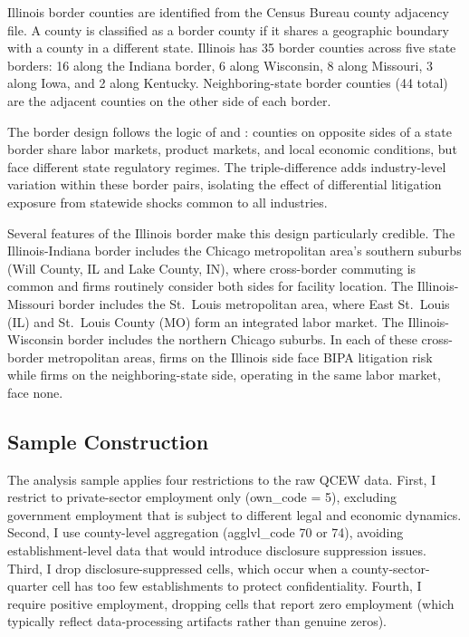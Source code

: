 \documentclass[12pt]{article}
\begin{document}
Illinois border counties are identified from the Census Bureau county adjacency file. A county is classified as a border county if it shares a geographic boundary with a county in a different state. Illinois has 35 border counties across five state borders: 16 along the Indiana border, 6 along Wisconsin, 8 along Missouri, 3 along Iowa, and 2 along Kentucky. Neighboring-state border counties (44 total) are the adjacent counties on the other side of each border.

The border design follows the logic of \citet{dube2010} and \citet{holmes1998}: counties on opposite sides of a state border share labor markets, product markets, and local economic conditions, but face different state regulatory regimes. The triple-difference adds industry-level variation within these border pairs, isolating the effect of differential litigation exposure from statewide shocks common to all industries.

Several features of the Illinois border make this design particularly credible. The Illinois-Indiana border includes the Chicago metropolitan area's southern suburbs (Will County, IL and Lake County, IN), where cross-border commuting is common and firms routinely consider both sides for facility location. The Illinois-Missouri border includes the St.\ Louis metropolitan area, where East St.\ Louis (IL) and St.\ Louis County (MO) form an integrated labor market. The Illinois-Wisconsin border includes the northern Chicago suburbs. In each of these cross-border metropolitan areas, firms on the Illinois side face BIPA litigation risk while firms on the neighboring-state side, operating in the same labor market, face none.

\subsection{Sample Construction}

The analysis sample applies four restrictions to the raw QCEW data. First, I restrict to private-sector employment only (own\_code = 5), excluding government employment that is subject to different legal and economic dynamics. Second, I use county-level aggregation (agglvl\_code 70 or 74), avoiding establishment-level data that would introduce disclosure suppression issues. Third, I drop disclosure-suppressed cells, which occur when a county-sector-quarter cell has too few establishments to protect confidentiality. Fourth, I require positive employment, dropping cells that report zero employment (which typically reflect data-processing artifacts rather than genuine zeros).
\end{document}
